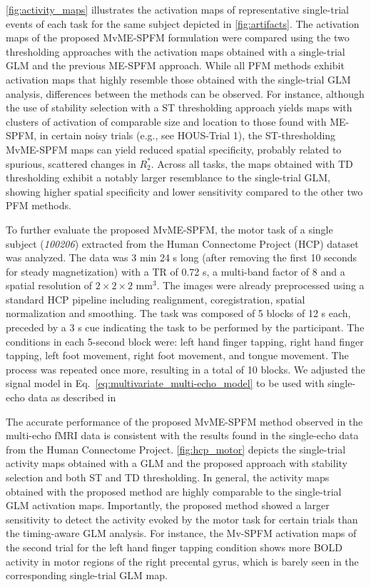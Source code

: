 \cref{fig:activity_maps} illustrates the activation maps of representative
single-trial events of each task for the same subject depicted in
\cref{fig:artifacts}. The activation maps of the proposed MvME-SPFM formulation
were compared using the two thresholding approaches with the activation maps
obtained with a single-trial GLM and the previous ME-SPFM approach. While all
PFM methods exhibit activation maps that highly resemble those obtained with the
single-trial GLM analysis, differences between the methods can be observed. For
instance, although the use of stability selection with a ST thresholding
approach yields maps with clusters of activation of comparable size and location
to those found with ME-SPFM, in certain noisy trials (e.g., see HOUS-Trial 1),
the ST-thresholding MvME-SPFM maps can yield reduced spatial specificity,
probably related to spurious, scattered changes in $R_2^*$. Across all tasks,
the maps obtained with TD thresholding exhibit a notably larger resemblance to
the single-trial GLM, showing higher spatial specificity and lower sensitivity
compared to the other two PFM methods. 

To further evaluate the proposed MvME-SPFM, the motor task of a single subject
(\textit{100206}) extracted from the Human Connectome Project (HCP) dataset
\citep{VanEssen2013WUMinnHuman} was analyzed. The data was 3 min 24 s long
(after removing the first 10 seconds for steady magnetization) with a TR of 0.72
s, a multi-band factor of 8 and a spatial resolution of $2\times2\times2$
mm$^3$. The images were already preprocessed using a standard HCP pipeline
including realignment, coregistration, spatial normalization and smoothing. The
task was composed of 5 blocks of 12 s each, preceded by a 3 s cue indicating the
task to be performed by the participant. The conditions in each 5-second block
were: left hand finger tapping, right hand finger tapping, left foot movement,
right foot movement, and tongue movement. The process was repeated once more,
resulting in a total of 10 blocks. We adjusted the signal model in
Eq.~\eqref{eq:multivariate_multi-echo_model} to be used with single-echo data as
described in
\citep{Gaudes2013Paradigmfreemapping,Urunuela2023HemodynamicDeconvolutionDemystified}

The accurate performance of the proposed MvME-SPFM method observed in the
multi-echo fMRI data is consistent with the results found in the single-echo
data from the Human Connectome Project. \cref{fig:hcp_motor} depicts the
single-trial activity maps obtained with a GLM and the proposed approach with
stability selection and both ST and TD thresholding. In general, the activity
maps obtained with the proposed method are highly comparable to the single-trial
GLM activation maps. Importantly, the proposed method showed a larger
sensitivity to detect the activity evoked by the motor task for certain trials
than the timing-aware GLM analysis. For instance, the Mv-SPFM activation maps of
the second trial for the left hand finger tapping condition shows more BOLD
activity in motor regions of the right precental gyrus, which is barely seen in
the corresponding single-trial GLM map.

